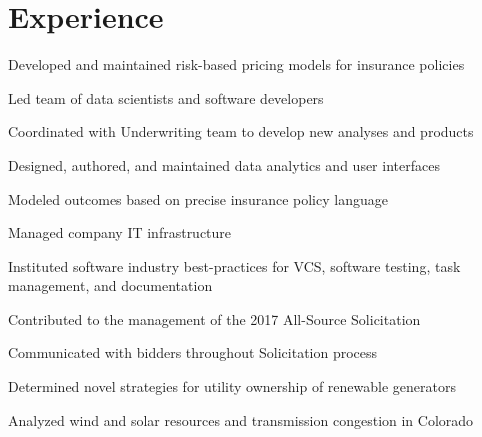 \documentclass[]{deedy-resume-openfont}
\begin{document}
\begin{minipage}[t]{0.66\textwidth}


\section{Experience}

	\vspace{\topsep}
	\begin{tightemize}
	\item Developed and maintained risk-based pricing models for insurance policies
	\item Led team of data scientists and software developers
	\item Coordinated with Underwriting team to develop new analyses and products
	\item Designed, authored, and maintained data analytics and user interfaces
	\item Modeled outcomes based on precise insurance policy language
	\item Managed company IT infrastructure
	\item Instituted software industry best-practices for VCS, software testing, task management, and documentation 
	\end{tightemize}
	\sectionsep

\begin{tightemize}
\item Contributed to the management of the 2017 All-Source Solicitation
\item Communicated with bidders throughout Solicitation process
\item Determined novel strategies for utility ownership of renewable generators
\item Analyzed wind and solar resources and transmission congestion in Colorado
\end{tightemize}
\sectionsep


\end{minipage}
\end{document}
